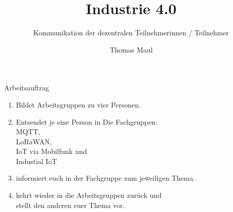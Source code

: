 \documentclass[aspectratio=169]{beamer}
\title{Industrie 4.0}
\subtitle{Kommunikation der dezentralen Teilnehmerinnen / Teilnehmer}
\author{Thomas Maul}
\institute[BWS Hofheim]{Brühlwiesenschule, Hofheim}
\begin{document}
\begin{frame}
  \titlepage
\end{frame}

\begin{frame}{Arbeitsauftrag}
    \begin{enumerate}
        \item Bildet Arbeitsgruppen zu vier Personen.
        \pause
        \item Entsendet je eine Person in Die Fachgruppen:\\MQTT,
        \\LoRaWAN, \\ IoT via Mobilfunk und \\ Industial IoT
        \item informiert euch in der Fachgruppe zum jeweiligen Thema.
        \pause
        \item kehrt wieder in die Arbeitsgruppen zurück und\\ stellt den anderen euer Thema vor.
    \end{enumerate}
\end{frame}
\end{document}
